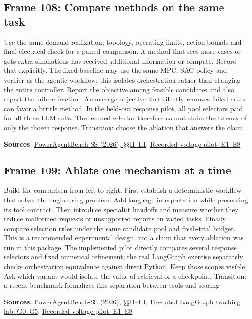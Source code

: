 \documentclass[11pt]{article}
\begin{document}
\subsection*{Frame 108: Compare methods on the same task}
Use the same demand realization, topology, operating limits, action bounds and final electrical check for a paired comparison. A method that sees more cases or gets extra simulations has received additional information or compute. Record that explicitly. The fixed baseline may use the same MPC, SAC policy and verifier as the agentic workflow; this isolates orchestration rather than changing the entire controller. Report the objective among feasible candidates and also report the failure fraction. An average objective that silently removes failed cases can favor a brittle method. In the held-out response pilot, all pool selectors paid for all three LLM calls. The learned selector therefore cannot claim the latency of only the chosen response. Transition: choose the ablation that answers the claim.\par
\par\nopagebreak\begin{minipage}{\linewidth}{\footnotesize\color{slate}\textbf{Sources.} \href{https://arxiv.org/html/2606.18789v1}{PowerAgentBench-SS (2026), \S{}\S{}II--III}; \href{../LLM_Response_Selection.html}{Recorded voltage pilot: E1--E8}\par}\end{minipage}\par\medskip
\subsection*{Frame 109: Ablate one mechanism at a time}
Build the comparison from left to right. First establish a deterministic workflow that solves the engineering problem. Add language interpretation while preserving its tool contract. Then introduce specialist handoffs and measure whether they reduce malformed requests or unsupported reports on varied tasks. Finally compare selection rules under the same candidate pool and fresh-trial budget. This is a recommended experimental design, not a claim that every ablation was run in this package. The implemented pilot directly compares several response selectors and fixed numerical refinement; the real LangGraph exercise separately checks orchestration equivalence against direct Python. Keep those scopes visible. Ask which variant would isolate the value of retrieval or a checkpoint. Transition: a recent benchmark formalizes this separation between tools and scoring.\par
\par\nopagebreak\begin{minipage}{\linewidth}{\footnotesize\color{slate}\textbf{Sources.} \href{https://arxiv.org/html/2606.18789v1}{PowerAgentBench-SS (2026), \S{}\S{}II--III}; \href{../Graph_Workflow_Lab.html}{Executed LangGraph teaching lab: G0--G5}; \href{../LLM_Response_Selection.html}{Recorded voltage pilot: E1--E8}\par}\end{minipage}\par\medskip
\end{document}
